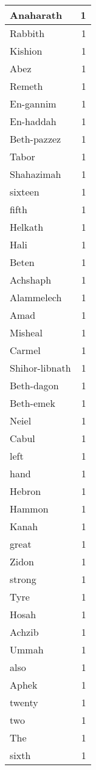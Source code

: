 \begin{center}
\begin{longtable}{l|r}
Anaharath & 1\\ \hline 
Rabbith & 1\\ \hline 
Kishion & 1\\ \hline 
Abez & 1\\ \hline 
Remeth & 1\\ \hline 
En-gannim & 1\\ \hline 
En-haddah & 1\\ \hline 
Beth-pazzez & 1\\ \hline 
Tabor & 1\\ \hline 
Shahazimah & 1\\ \hline 
sixteen & 1\\ \hline 
fifth & 1\\ \hline 
Helkath & 1\\ \hline 
Hali & 1\\ \hline 
Beten & 1\\ \hline 
Achshaph & 1\\ \hline 
Alammelech & 1\\ \hline 
Amad & 1\\ \hline 
Misheal & 1\\ \hline 
Carmel & 1\\ \hline 
Shihor-libnath & 1\\ \hline 
Beth-dagon & 1\\ \hline 
Beth-emek & 1\\ \hline 
Neiel & 1\\ \hline 
Cabul & 1\\ \hline 
left & 1\\ \hline 
hand & 1\\ \hline 
Hebron & 1\\ \hline 
Hammon & 1\\ \hline 
Kanah & 1\\ \hline 
great & 1\\ \hline 
Zidon & 1\\ \hline 
strong & 1\\ \hline 
Tyre & 1\\ \hline 
Hosah & 1\\ \hline 
Achzib & 1\\ \hline 
Ummah & 1\\ \hline 
also & 1\\ \hline 
Aphek & 1\\ \hline 
twenty & 1\\ \hline 
two & 1\\ \hline 
The & 1\\ \hline 
sixth & 1\\ \hline 

\end{longtable}
\end{center}

